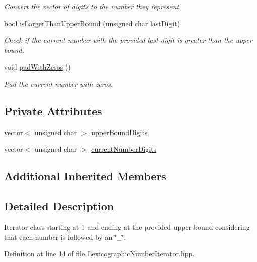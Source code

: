 \begin{DoxyCompactItemize}
\begin{DoxyCompactList}\small\item\em Convert the vector of digits to the number they represent. \end{DoxyCompactList}\item 
bool \hyperlink{classmultiscale_1_1LexicographicNumberIterator_a8fad6e84a483cee3bd52c926de73d15f}{is\-Larger\-Than\-Upper\-Bound} (unsigned char last\-Digit)
\begin{DoxyCompactList}\small\item\em Check if the current number with the provided last digit is greater than the upper bound. \end{DoxyCompactList}\item 
void \hyperlink{classmultiscale_1_1LexicographicNumberIterator_a063dc7e6097724e96ed36bab4d20871b}{pad\-With\-Zeros} ()
\begin{DoxyCompactList}\small\item\em Pad the current number with zeros. \end{DoxyCompactList}\end{DoxyCompactItemize}
\subsection*{Private Attributes}
\begin{DoxyCompactItemize}
\item 
vector$<$ unsigned char $>$ \hyperlink{classmultiscale_1_1LexicographicNumberIterator_a909a054ae4d3e79e5daa3059a94000d0}{upper\-Bound\-Digits}
\item 
vector$<$ unsigned char $>$ \hyperlink{classmultiscale_1_1LexicographicNumberIterator_af42ebeea695a31c2da714332c520ae79}{current\-Number\-Digits}
\end{DoxyCompactItemize}
\subsection*{Additional Inherited Members}


\subsection{Detailed Description}
Iterator class starting at 1 and ending at the provided upper bound considering that each number is followed by an \char`\"{}\-\_\-\char`\"{}. 

Definition at line 14 of file Lexicographic\-Number\-Iterator.\-hpp.



